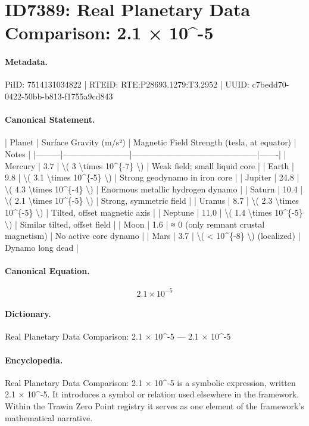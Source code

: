 \section*{ID7389: Real Planetary Data Comparison: 2.1 × 10\textasciicircum{}-5}
\paragraph{Metadata.}
PiID: 7514131034822 | RTEID: RTE:P28693.1279:T3.2952 | UUID: c7bedd70-0422-50bb-b813-f1755a9cd843

\paragraph{Canonical Statement.}
| Planet | Surface Gravity (m/s²) | Magnetic Field Strength (tesla, at equator) | Notes | |---------|------------------------|---------------------------------------------|-------| | Mercury | 3.7 | \textbackslash{}( 3 \textbackslash{}times 10\textasciicircum{}\{-7\} \textbackslash{}) | Weak field; small liquid core | | Earth | 9.8 | \textbackslash{}( 3.1 \textbackslash{}times 10\textasciicircum{}\{-5\} \textbackslash{}) | Strong geodynamo in iron core | | Jupiter | 24.8 | \textbackslash{}( 4.3 \textbackslash{}times 10\textasciicircum{}\{-4\} \textbackslash{}) | Enormous metallic hydrogen dynamo | | Saturn | 10.4 | \textbackslash{}( 2.1 \textbackslash{}times 10\textasciicircum{}\{-5\} \textbackslash{}) | Strong, symmetric field | | Uranus | 8.7 | \textbackslash{}( 2.3 \textbackslash{}times 10\textasciicircum{}\{-5\} \textbackslash{}) | Tilted, offset magnetic axis | | Neptune | 11.0 | \textbackslash{}( 1.4 \textbackslash{}times 10\textasciicircum{}\{-5\} \textbackslash{}) | Similar tilted, offset field | | Moon | 1.6 | ≈ 0 (only remnant crustal magnetism) | No active core dynamo | | Mars | 3.7 | \textbackslash{}( < 10\textasciicircum{}\{-8\} \textbackslash{}) (localized) | Dynamo long dead |

\paragraph{Canonical Equation.}
\[
2.1 \times 10^{-5}
\]

\paragraph{Dictionary.}
Real Planetary Data Comparison: 2.1 × 10\textasciicircum{}-5 — 2.1 × 10\textasciicircum{}-5

\paragraph{Encyclopedia.}
Real Planetary Data Comparison: 2.1 × 10\textasciicircum{}-5 is a symbolic expression, written 2.1 × 10\textasciicircum{}-5. It introduces a symbol or relation used elsewhere in the framework. Within the Trawin Zero Point registry it serves as one element of the framework's mathematical narrative.
